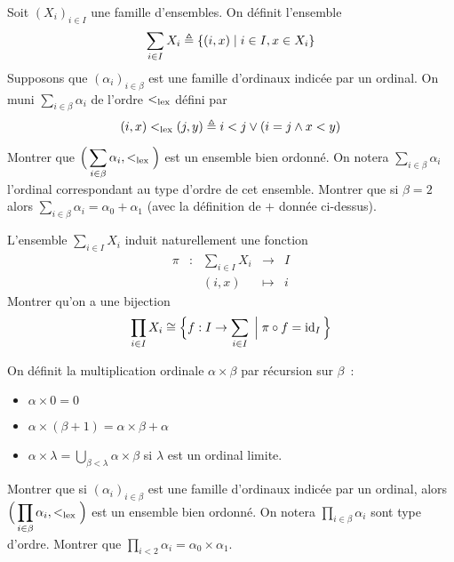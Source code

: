 \begin{exercise}
  Soit $(X_i)_{i\in I}$ une famille d'ensembles. On définit l'ensemble
  \[\sum_{i\in I} X_i \triangleq \{(i,x)\mid i\in I, x \in X_i\}\]
  Supposons que $(\alpha_i)_{i\in \beta}$ est une famille d'ordinaux indicée par
  un ordinal. On muni $\sum_{i\in\beta} \alpha_i$ de l'ordre $<_{\mathrm{lex}}$ défini par
  \[(i,x)<_{\mathrm{lex}} (j,y) \triangleq i < j \lor (i = j \land x < y)\]

  Montrer que $\displaystyle\Big(\sum_{i\in \beta}\alpha_i,<_{\mathrm{lex}}\Big)$ est un
  ensemble bien ordonné. On notera $\displaystyle\sum_{i\in\beta}\alpha_i$
  l'ordinal correspondant au type d'ordre de cet ensemble. Montrer que si
  $\beta = 2$ alors $\displaystyle\sum_{i\in\beta}\alpha_i = \alpha_0 + \alpha_1$
  (avec la définition de $+$ donnée ci-dessus).
\end{exercise}

\begin{exercise}
  L'ensemble $\sum_{i\in I} X_i$ induit naturellement une fonction
  \[\begin{array}{ccccc}
  \pi & : & \sum_{i\in I} X_i & \longrightarrow & I\\
  & & (i,x) & \longmapsto & i
  \end{array}\]
  Montrer qu'on a une bijection
  \[\prod_{i \in I} X_i \cong \Big\{f : I \to \sum_{i \in I}\;\Big|\;
  \pi\circ f = \operatorname{id}_I\Big\}\]
\end{exercise}

\begin{definition}
  On définit la multiplication ordinale $\alpha\times \beta$ par récursion sur
  $\beta$~:
  \begin{itemize}
  \item $\alpha \times 0 = 0$
  \item $\alpha \times (\beta + 1) = \alpha \times \beta + \alpha$
  \item $\displaystyle \alpha \times \lambda = \bigcup_{\beta < \lambda} \alpha
    \times \beta$ si $\lambda$ est un ordinal limite.
  \end{itemize}
\end{definition}

\begin{exercise}
  Montrer que si $(\alpha_i)_{i\in \beta}$ est une famille d'ordinaux indicée par
  un ordinal, alors $\displaystyle\Big(\prod_{i\in \beta}\alpha_i,<_{\mathrm{lex}}\Big)$
  est un ensemble bien ordonné. On notera $\prod_{i\in\beta}\alpha_i$ sont type
  d'ordre. Montrer que
  $\displaystyle\prod_{i < 2}\alpha_i = \alpha_0\times\alpha_1$.
\end{exercise}

